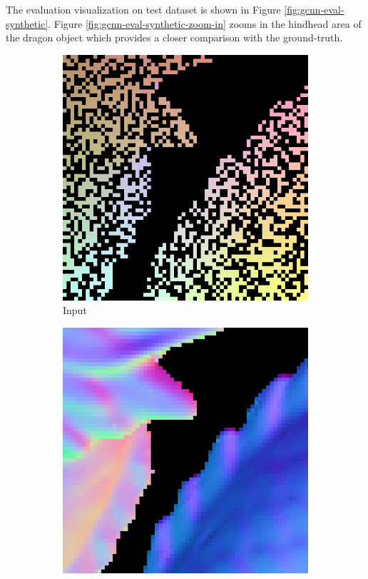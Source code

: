 The evaluation visualization on test dataset is shown in Figure \ref{fig:gcnn-eval-synthetic}. Figure \ref{fig:gcnn-eval-synthetic-zoom-in} zooms in the hindhead area of the dragon object which provides a closer comparison with the ground-truth.
\begin{figure}[th]
	\centering
	\begin{subfigure}[b]{0.15\linewidth}
		\includegraphics[width=\linewidth]{./Figures/comparison/eval_2_input.png}
		\caption{Input}
	\end{subfigure}
	\begin{subfigure}[b]{0.15\linewidth}
		\includegraphics[width=\linewidth]{./Figures/comparison/eval_2_normal_GT.png}

\end{subfigure}
\end{figure}

